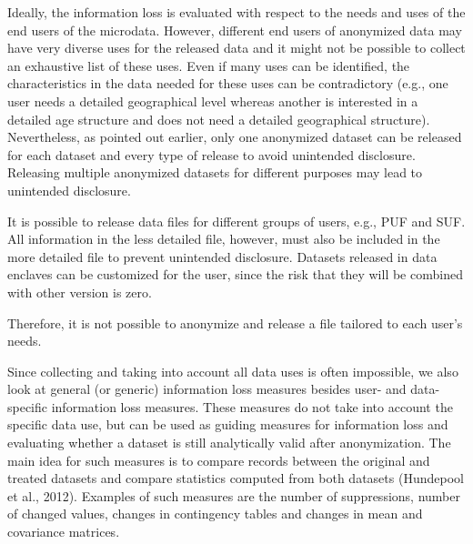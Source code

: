 \documentclass[letterpaper,10pt,english]{sphinxmanual}
\begin{document}
Ideally, the information loss is evaluated with respect to the needs and
uses of the end users of the microdata. However, different end users of
anonymized data may have very diverse uses for the released data and it
might not be possible to collect an exhaustive list of these uses. Even
if many uses can be identified, the characteristics in the data needed
for these uses can be contradictory (e.g., one user needs a detailed
geographical level whereas another is interested in a detailed age
structure and does not need a detailed geographical structure).
Nevertheless, as pointed out earlier, only one anonymized dataset can be
released for each dataset and every type of release to avoid unintended
disclosure. Releasing multiple anonymized datasets for different
purposes may lead to unintended disclosure. %
\begin{footnote}[1]\sphinxAtStartFootnote
It is possible to release data files for different groups of users,
e.g., PUF and SUF. All information in the less detailed file,
however, must also be included in the more detailed file to prevent
unintended disclosure. Datasets released in data enclaves can be
customized for the user, since the risk that they will be combined
with other version is zero.
%
\end{footnote}
Therefore, it is not possible to anonymize and release a file tailored
to each user’s needs.

Since collecting and taking into account all data uses is often
impossible, we also look at general (or generic) information loss
measures besides user- and data-specific information loss measures.
These measures do not take into account the specific data use, but can
be used as guiding measures for information loss and evaluating whether
a dataset is still analytically valid after anonymization. The main idea
for such measures is to compare records between the original and treated
datasets and compare statistics computed from both datasets (Hundepool
et al., 2012). Examples of such measures are the number of suppressions,
number of changed values, changes in contingency tables and changes in
mean and covariance matrices.
\end{document}
